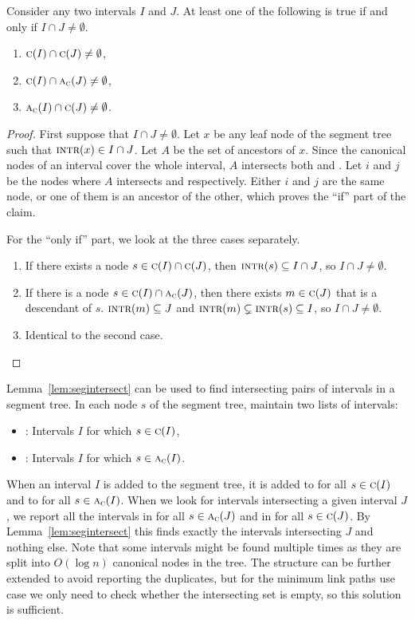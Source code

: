 \documentclass[english,gradu]{tktltiki2018}
\begin{document}
\begin{lem}\label{lem:segintersect}Consider any two intervals $I$ and $J$.
At least one of the following is true if and only if $I\cap J\neq\emptyset$.
\begin{enumerate}
\item $\textsc{c}(I)\cap\textsc{c}(J)\neq\emptyset$,
\item $\textsc{c}(I)\cap\textsc{a}_{\textsc{c}}(J)\neq\emptyset$,
\item $\textsc{a}_{\textsc{c}}(I)\cap\textsc{c}(J)\neq\emptyset$.
\end{enumerate}
\end{lem}
\begin{proof}
First suppose that $I\cap J\neq\emptyset$.
Let $x$ be any leaf node of the segment tree such that $\textsc{intr}(x)\in I\cap J$.
Let $A$ be the set of ancestors of $x$.
Since the canonical nodes of an interval cover the whole interval, $A$ intersects both  and .
Let $i$ and $j$ be the nodes where $A$ intersects  and  respectively.
Either $i$ and $j$ are the same node, or one of them is an ancestor of the other, which proves the ``if'' part of the claim.

For the ``only if'' part, we look at the three cases separately.
\begin{enumerate}
\item If there exists a node $s\in\textsc{c}(I)\cap\textsc{c}(J)$, then $\textsc{intr}(s)\subseteq I\cap J$, so $I\cap J\neq\emptyset$.
\item If there is a node $s\in\textsc{c}(I)\cap\textsc{a}_{\textsc{c}}(J)$, then there exists $m\in\textsc{c}(J)$ that is a descendant of $s$. $\textsc{intr}(m)\subseteq J$ and $\textsc{intr}(m)\subsetneq\textsc{intr}(s)\subseteq I$, so $I\cap J\neq\emptyset$.
\item Identical to the second case.
\end{enumerate}
\end{proof}

Lemma~\ref{lem:segintersect} can be used to find intersecting pairs of intervals in a segment tree.
In each node $s$ of the segment tree, maintain two lists of intervals:
\begin{itemize}
\item {}: Intervals $I$ for which $s\in\textsc{c}(I)$,
\item {}: Intervals $I$ for which $s\in\textsc{a}_{\textsc{c}}(I)$.
\end{itemize}
When an interval $I$ is added to the segment tree, it is added to  for all $s\in\textsc{c}(I)$ and to  for all $s\in\textsc{a}_{\textsc{c}}(I)$.
When we look for intervals intersecting a given interval $J$, we report all the intervals in  for all $s\in\textsc{a}_{\textsc{c}}(J)$ and in  for all $s\in\textsc{c}(J)$.
By Lemma~\ref{lem:segintersect} this finds exactly the intervals intersecting $J$ and nothing else.
Note that some intervals might be found multiple times as they are split into $O(\log n)$ canonical nodes in the tree.
The structure can be further extended to avoid reporting the duplicates, but for the minimum link paths use case we only need to check whether the intersecting set is empty, so this solution is sufficient.
\end{document}
